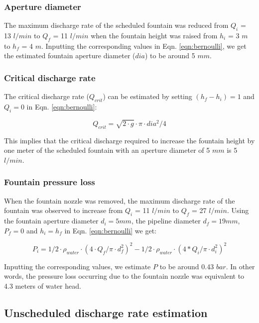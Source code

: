 \documentclass[tc, manuscript]{copernicus}
\begin{document}
\subsubsection{Aperture diameter}
The maximum discharge rate of the scheduled fountain was reduced from $Q_i$ =  13 $l/min$ to $Q_f$ = 11 $l/min$
when the fountain height was raised from  $h_i$ = 3 $m$ to $h_f$ = 4 $m$. Inputting the corresponding values in
Eqn. \ref{eqn:bernoulli}, we get the estimated fountain aperture diameter ($dia$) to be around 5 $mm$. 


\subsubsection{Critical discharge rate}

The critical discharge rate ($Q_{crit}$) can be estimated by setting $(h_f - h_i) = 1$ and $Q_i=0$ in Eqn.
\ref{eqn:bernoulli}: 

\begin{equation}
  Q_{crit} = \sqrt{2 \cdot g } \cdot \pi \cdot dia^2/4
\end{equation}

This implies that the critical discharge required to increase the fountain height by one meter of the scheduled
fountain with an aperture diameter of 5 $mm$ is 5 $l/min$.

\subsubsection{Fountain pressure loss}

When the fountain nozzle was removed, the maximum discharge rate of the fountain was observed to increase from
$Q_{i}$ = 11 $l/min$ to $Q_{f}$ = 27 $l/min$. Using the fountain aperture diameter $d_i = 5 mm$, the pipeline
diameter $d_f = 19 mm$, $P_{f} = 0$ and $h_{i} = h_{f}$ in Eqn. \ref{eqn:bernoulli} we get: 

\begin{equation}
  P_{i} = 1/2 \cdot \rho_{water} \cdot (4 \cdot Q_f/\pi \cdot d_f^2)^2 - 1/2 \cdot \rho_{water} \cdot (4 * Q_i/\pi \cdot d_i^2)^2
\end{equation}

Inputting the corresponding values, we estimate $P$ to be around 0.43 $bar$. In other words, the pressure loss
occurring due to the fountain nozzle was equivalent to 4.3 meters of water head.

\subsection{Unscheduled discharge rate estimation}
\end{document}
